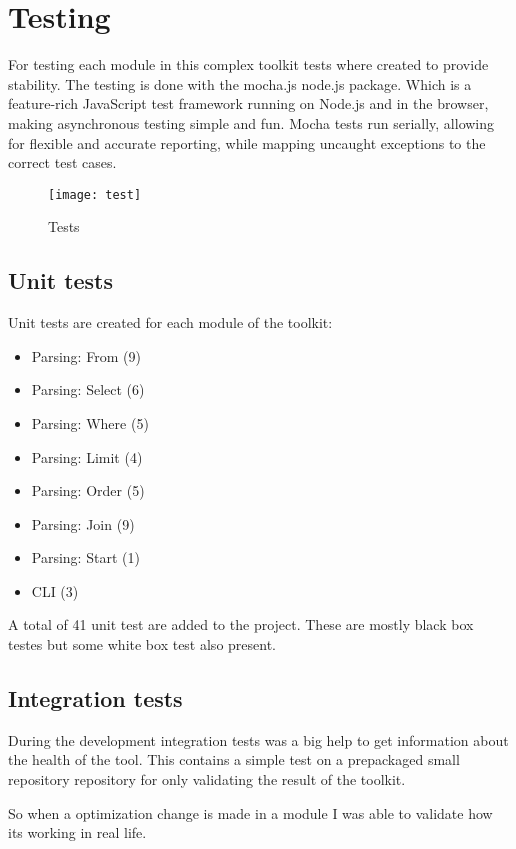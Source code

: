 \section{Testing}

For testing each module in this complex toolkit tests where created to provide stability. The testing is done with the mocha.js\cite{mocha} node.js package. Which is a feature-rich JavaScript test framework running on Node.js and in the browser, making asynchronous testing simple and fun. Mocha tests run serially, allowing for flexible and accurate reporting, while mapping uncaught exceptions to the correct test cases.

\begin{figure}[H]
	\centering
	\texttt{[image: test]}
	\caption{Tests}
	\label{fig:fig-test}
\end{figure}

\subsection{Unit tests}

Unit tests are created for each module of the toolkit:

\begin{itemize}
	\item Parsing: From (9)
	\item Parsing: Select (6)
	\item Parsing: Where (5)
	\item Parsing: Limit (4)
	\item Parsing: Order (5)
	\item Parsing: Join (9)
	\item Parsing: Start (1)
	\item CLI (3)
\end{itemize}

A total of 41 unit test are added to the project. These are mostly black box testes but some white box test also present.

\subsection{Integration tests}

During the development integration tests was a big help to get information about the health of the tool. This contains a simple test on a prepackaged small repository repository for only validating the result of the toolkit.

So when a optimization change is made in a module I was able to validate how its working in real life.

